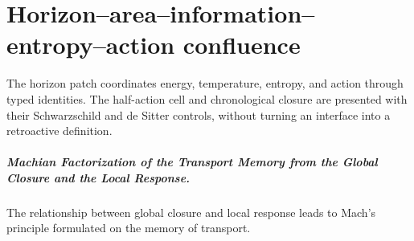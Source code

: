 \chapter{Horizon–area–information–entropy–action confluence}
\label{chap:parte-iv-69}

The horizon patch coordinates energy, temperature, entropy, and action through typed identities. The half-action cell and chronological closure are presented with their Schwarzschild and de Sitter controls, without turning an interface into a retroactive definition.



\paragraph{Machian Factorization of the Transport Memory from the Global Closure and the Local Response.} The relationship between global closure and local response leads to Mach's principle formulated on the memory of transport.
